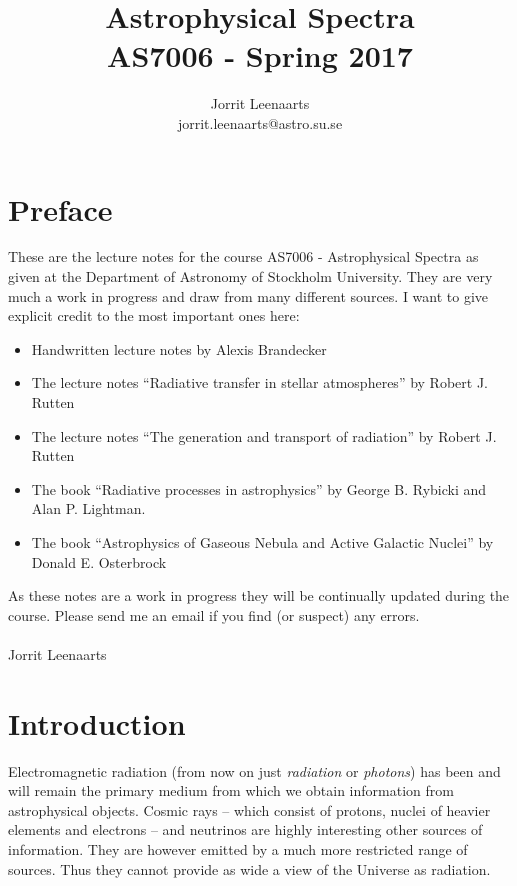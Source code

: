 \documentclass[12pt]{article}
\title{Astrophysical Spectra\\
         AS7006  - Spring 2017}
\author{Jorrit Leenaarts\\ jorrit.leenaarts@astro.su.se}
\date{}
\numberwithin{equation}{section}
\begin{document}
\maketitle
\clearpage
\tableofcontents
\newpage

\section*{Preface}

These are the lecture notes for the course AS7006 - Astrophysical Spectra as given at the Department of Astronomy of Stockholm University. They are very much a work in progress and draw from many different sources. I want to give explicit credit to the most important ones here:
\begin{itemize}
\item Handwritten lecture notes by Alexis Brandecker
\item The lecture notes ``Radiative transfer in stellar atmospheres'' by Robert J. Rutten
\item The lecture notes ``The generation and transport of radiation'' by Robert J. Rutten
\item The book ``Radiative processes in astrophysics'' by George B. Rybicki and Alan P. Lightman.
\item The book ``Astrophysics of Gaseous Nebula and Active Galactic Nuclei'' by Donald E. Osterbrock
\end{itemize}
As these notes are a work in progress they will be continually updated during the course. Please send me an email if you find (or suspect) any errors.
\\
\\
Jorrit Leenaarts


\newpage
\section{Introduction}

Electromagnetic radiation (from now on just {\it radiation} or {\it photons})  has been and will remain the primary medium from which we obtain information from astrophysical objects. Cosmic rays -- which consist of protons, nuclei of heavier elements and electrons -- and  neutrinos are highly interesting other sources of information. They are however emitted by a much more restricted range of sources. Thus they cannot provide as wide a view of the Universe as radiation.
\end{document}
